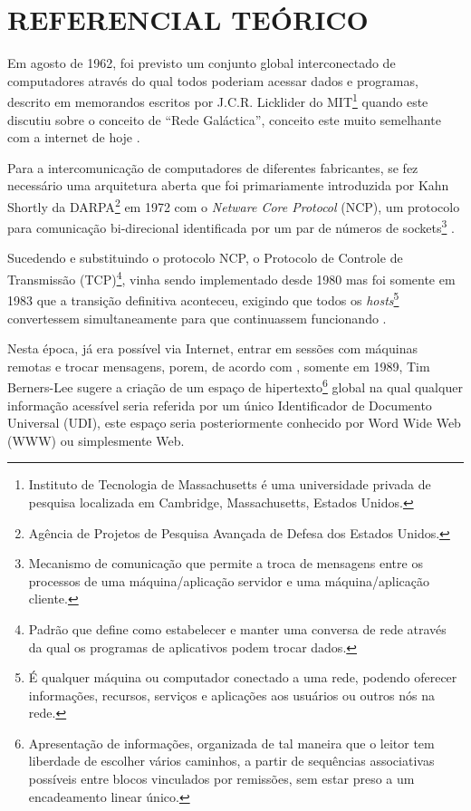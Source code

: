 \section{REFERENCIAL TEÓRICO}

Em agosto de 1962, foi previsto um conjunto global interconectado de computadores através do qual todos poderiam acessar dados e programas, descrito em memorandos escritos por J.C.R. Licklider do MIT\footnote{Instituto de Tecnologia de Massachusetts é uma universidade privada de pesquisa localizada em Cambridge, Massachusetts, Estados Unidos.} quando este discutiu sobre o conceito de “Rede Galáctica”, conceito este muito semelhante com a internet de hoje \cite[p.~2]{Leiner2009}.

Para a intercomunicação de computadores de diferentes fabricantes, se fez necessário uma arquitetura aberta que foi primariamente introduzida por Kahn Shortly da DARPA\footnote{Agência de Projetos de Pesquisa Avançada de Defesa dos Estados Unidos.} em 1972 com o \emph{Netware Core Protocol} (NCP), um protocolo para comunicação bi-direcional identificada por um par de números de sockets\footnote{Mecanismo de comunicação que permite a troca de mensagens entre os processos de uma máquina/aplicação servidor e uma máquina/aplicação cliente.} \cite[p.~4]{Leiner2009}.

Sucedendo e substituindo o protocolo NCP, o Protocolo de Controle de Transmissão (TCP)\footnote{Padrão que define como estabelecer e manter uma conversa de rede através da qual os programas de aplicativos podem trocar dados.}, vinha sendo implementado desde 1980 mas foi somente em 1983 que a transição definitiva aconteceu, exigindo que todos os \emph{hosts}\footnote{É qualquer máquina ou computador conectado a uma rede, podendo oferecer informações, recursos, serviços e aplicações aos usuários ou outros nós na rede.} convertessem simultaneamente para que continuassem funcionando \cite[p.~7]{Leiner2009}.

Nesta época, já era possível via Internet, entrar em sessões com máquinas remotas e trocar mensagens, porem, de acordo com , somente em 1989, Tim Berners-Lee sugere a criação de um espaço de hipertexto\footnote{Apresentação de informações, organizada de tal maneira que o leitor tem liberdade de escolher vários caminhos, a partir de sequências associativas possíveis entre blocos vinculados por remissões, sem estar preso a um encadeamento linear único.} global na qual qualquer informação acessível seria referida por um único Identificador de Documento Universal (UDI), este espaço seria posteriormente conhecido por Word Wide Web (WWW) ou simplesmente Web.

